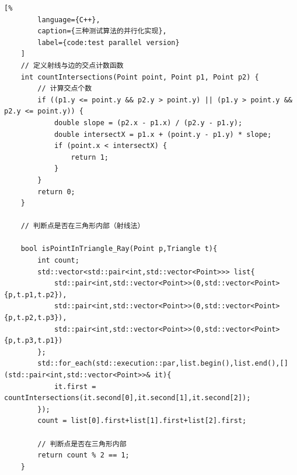 {\begin{lstlisting}[%
        language={C++},
        caption={三种测试算法的并行化实现},
        label={code:test parallel version}
    ]
    // 定义射线与边的交点计数函数
    int countIntersections(Point point, Point p1, Point p2) {
        // 计算交点个数
        if ((p1.y <= point.y && p2.y > point.y) || (p1.y > point.y && p2.y <= point.y)) {
            double slope = (p2.x - p1.x) / (p2.y - p1.y);
            double intersectX = p1.x + (point.y - p1.y) * slope;
            if (point.x < intersectX) {
                return 1;
            }
        }
        return 0;
    }
    
    // 判断点是否在三角形内部（射线法）
    
    bool isPointInTriangle_Ray(Point p,Triangle t){
        int count;
        std::vector<std::pair<int,std::vector<Point>>> list{
            std::pair<int,std::vector<Point>>(0,std::vector<Point>{p,t.p1,t.p2}),
            std::pair<int,std::vector<Point>>(0,std::vector<Point>{p,t.p2,t.p3}),
            std::pair<int,std::vector<Point>>(0,std::vector<Point>{p,t.p3,t.p1})
        };
        std::for_each(std::execution::par,list.begin(),list.end(),[](std::pair<int,std::vector<Point>>& it){
            it.first = countIntersections(it.second[0],it.second[1],it.second[2]);
        });
        count = list[0].first+list[1].first+list[2].first;

        // 判断点是否在三角形内部
        return count % 2 == 1;
    }

    \end{lstlisting}

}

